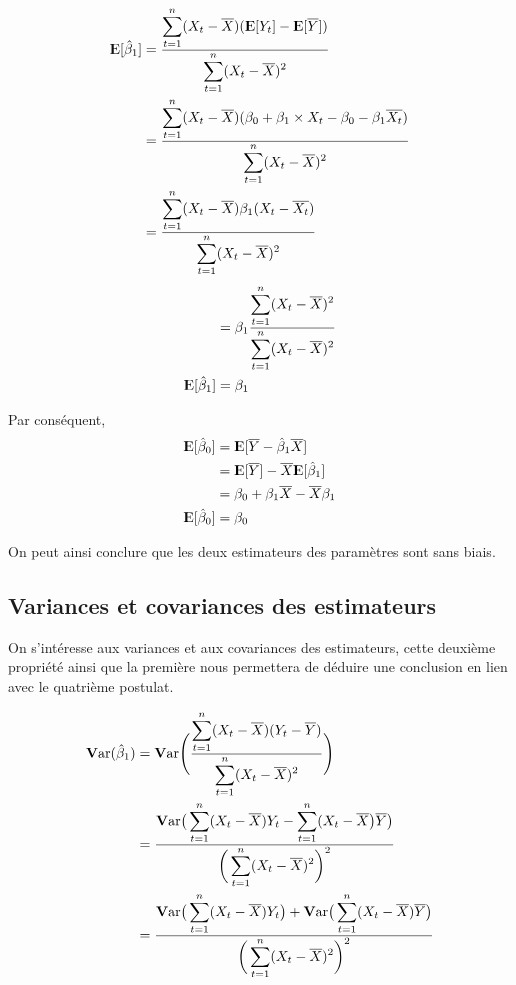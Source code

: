 \documentclass[11pt,french]{report}
\newcommand{\E}{{\rm I\kern-.3em E}}
\newcommand{\Var}{\mathrm{\textbf{V}ar}}
\begin{document}
\begin{align*}
\E[\hat{\beta}_1] &= \frac{\displaystyle\sum_{t=1}^n(X_t- \overline{X})(\E[Y_t] - \E[\overline{Y}])}{\displaystyle\displaystyle\sum_{t=1}^n(X_t - \overline{X})^2} \\
&= \frac{\displaystyle\sum_{t=1}^n(X_t- \overline{X})(\beta_0 + \beta_1\times X_t - \beta_0 - \beta_1\overline{X_t})}{\displaystyle\sum_{t=1}^n(X_t - \overline{X})^2} \\
&= \frac{\displaystyle\sum_{t=1}^n(X_t- \overline{X})\beta_1 (X_t - \overline{X_t})}{\displaystyle\sum_{t=1}^n(X_t - \overline{X})^2} \\
\end{align*}
\begin{align*}
&= \beta_1 \frac{\displaystyle\sum_{t=1}^n(X_t- \overline{X})^2}{\displaystyle\sum_{t=1}^n(X_t - \overline{X})^2} \\
\E[\hat{\beta}_1] &= \beta_1
\end{align*}
\bigskip

Par conséquent,
\begin{align*}
\E[\hat{\beta}_0] &= \E[\overline{Y} - \hat{\beta}_1 \overline{X}] \\
&= \E[\overline{Y}] - \overline{X} \E[\hat{\beta}_1]  \\
&= \beta_0 + \beta_1\overline{X} - \overline{X}\beta_1 \\
\E[\hat{\beta}_0]  &= \beta_0 \\
\end{align*}

On peut ainsi conclure que les deux estimateurs des paramètres sont sans biais.

\subsection{Variances et covariances des estimateurs}
On s'intéresse aux variances et aux covariances des estimateurs, cette deuxième propriété ainsi que la première nous permettera de déduire une conclusion en lien avec le quatrième postulat.

\begin{align*}
\Var(\hat{\beta}_1) &= \Var\Bigg( \frac{\displaystyle\sum_{t=1}^n(X_t- \overline{X})(Y_t - \overline{Y})}{\displaystyle\sum_{t=1}^n(X_t - \overline{X})^2} \Bigg)\\
&= \frac{\Var\big( \displaystyle\displaystyle\sum_{t=1}^n(X_t- \overline{X})Y_t - \displaystyle\sum_{t=1}^n(X_t- \overline{X} \big)\overline{Y}\big)}{\bigg( \displaystyle\sum_{t=1}^n(X_t - \overline{X})^2 \bigg)^2} \\
&= \frac{\Var\big( \displaystyle\sum_{t=1}^n(X_t- \overline{X})Y_t\big) + \Var\big(\displaystyle\sum_{t=1}^n(X_t- \overline{X})\overline{Y}\big)}{\bigg( \displaystyle\displaystyle\sum_{t=1}^n(X_t - \overline{X})^2 \bigg)^2} \\
\end{align*}
\end{document}
